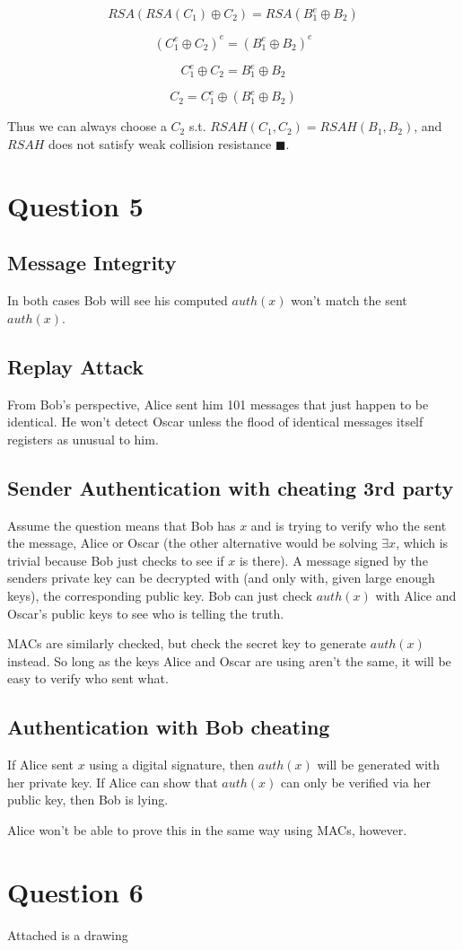 \documentclass[a4paper,10pt]{article}
\begin{document}
$$RSA(RSA(C_{1}) \oplus C_{2} ) =  RSA(B_{1}^{e} \oplus B_{2} )$$

$$(C_{1}^{e} \oplus C_{2} )^{e} =  (B_{1}^{e} \oplus B_{2} )^{e}$$

$$C_{1}^{e} \oplus C_{2} =  B_{1}^{e} \oplus B_{2} $$

$$C_{2} =  C_{1}^{e} \oplus (B_{1}^{e} \oplus B_{2}) $$


Thus we can always choose a $C_{2}$ s.t. $RSAH(C_{1},C_{2}) = RSAH(B_{1},B_{2})$, and $RSAH$ does not satisfy weak collision resistance $\blacksquare$.
\pagebreak

\section{Question 5}

\subsection{Message Integrity}
In both cases Bob will see his computed $auth(x)$ won't match the sent $auth(x)$.

\subsection{Replay Attack} 
From Bob's perspective, Alice sent him 101 messages that just happen to be identical.  He won't detect Oscar unless the flood of identical messages itself registers as unusual to him. 

\subsection{Sender Authentication with cheating 3rd party}
Assume the question means that Bob has $x$ and is trying to verify who the sent the message, Alice or Oscar (the other alternative would be solving $\exists x$, which is trivial because Bob just checks to see if $x$ is there).  A message signed by the senders private key can be decrypted with (and only with, given large enough keys), the corresponding public key.  Bob can just check $auth(x)$ with Alice and Oscar's public keys to see who is telling the truth.

MACs are similarly checked, but check the secret key to generate $auth(x)$ instead.  So long as the keys Alice and Oscar are using aren't the same, it will be easy to verify who sent what.

\subsection{Authentication with Bob cheating}

If Alice sent $x$ using a digital signature, then $auth(x)$ will be generated with her private key. If Alice can show that $auth(x)$ can only be verified via her public key, then Bob is lying.

Alice won't be able to prove this in the same way using MACs, however.

\section{Question 6}

Attached is a drawing
\end{document}
